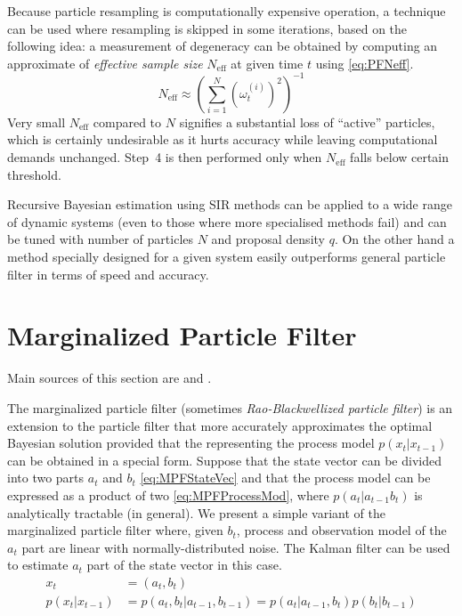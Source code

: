Because particle resampling is computationally expensive operation, a technique can be used where
resampling is skipped in some iterations, based on the following idea:
a measurement of degeneracy can be obtained by computing an
approximate of \emph{effective sample size} \(N_{\text{eff}}\) at given time \(t\) using
\eqref{eq:PFNeff}.~\cite{AruMasGor:02}
\begin{equation} \label{eq:PFNeff}
	N_{\text{eff}} \approx \left( \sum_{i=1}^N \left( \omega_t^{(i)} \right)^2 \right)^{-1}
\end{equation}
Very small \(N_{\text{eff}}\) compared to \(N\) signifies a substantial loss of ``active'' particles,
which is certainly undesirable as it hurts accuracy while leaving computational demands unchanged.
Step~4 is then performed only when \(N_{\text{eff}}\) falls below certain threshold.

Recursive Bayesian estimation using SIR methods can be applied to a wide range of dynamic systems
(even to those where more specialised methods fail) and can be tuned with number of particles \(N\) and
proposal density \(q\). On the other hand a method specially designed for a given system easily
outperforms general particle filter in terms of speed and accuracy.

\section{Marginalized Particle Filter}

Main sources of this section are \cite{SchGusNor:05} and \cite{SchKarGus:06}.

The marginalized particle filter (sometimes \emph{Rao-Blackwellized particle filter}) is an
extension to the particle filter that more accurately approximates the optimal Bayesian solution
provided that the {\pdf} representing the process model \(p(x_t|x_{t-1})\) can be obtained in
a special form. Suppose that the state vector can be divided into two parts \(a_t\) and \(b_t\)
\eqref{eq:MPFStateVec} and that the process model {\pdf} can be expressed as a product of two
{\pdfs} \eqref{eq:MPFProcessMod}, where \(p(a_t|a_{t-1} b_t)\) is analytically tractable (in general).
We present a simple variant of the marginalized particle filter where, given \(b_t\), process and
observation model of the \(a_t\) part are linear with normally-distributed noise. The Kalman filter
can be used to estimate \(a_t\) part of the state vector in this case.
\begin{align}
	x_t &= (a_t, b_t) \label{eq:MPFStateVec} \\
	p(x_t|x_{t-1}) &= p(a_t, b_t|a_{t-1}, b_{t-1}) = p(a_t|a_{t-1}, b_t) p(b_t | b_{t-1}) \label{eq:MPFProcessMod}
\end{align}

